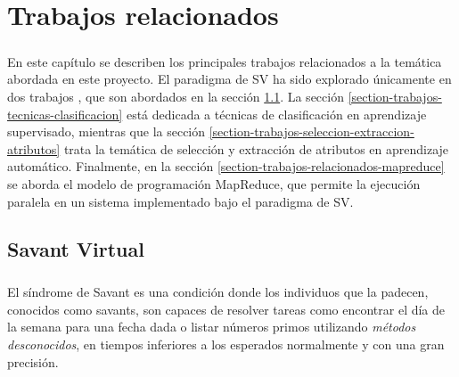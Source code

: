 \chapter{Trabajos relacionados} \label{section-trabajo-relacionado}

\paragraph{}En este capítulo se describen los principales trabajos relacionados a la temática abordada en este proyecto. El paradigma de SV ha sido explorado únicamente en dos trabajos \cite{savant-original} \cite{savant-bag}, que son abordados en la sección \ref{section-trabajos-relacionados-savant}. La sección \ref{section-trabajos-tecnicas-clasificacion} está dedicada a técnicas de clasificación en aprendizaje supervisado, mientras que la sección \ref{section-trabajos-seleccion-extraccion-atributos} trata la temática de selección y extracción de atributos en aprendizaje automático. Finalmente, en la sección \ref{section-trabajos-relacionados-mapreduce} se aborda el modelo de programación MapReduce, que permite la ejecución paralela en un sistema implementado bajo el paradigma de SV.


\section{Savant Virtual} \label{section-trabajos-relacionados-savant}

\paragraph{} El síndrome de Savant es una condición donde los individuos que la padecen, conocidos como savants, son capaces de resolver tareas como encontrar el día de la semana para una fecha dada o listar números primos utilizando \textit{métodos desconocidos}, en tiempos inferiores a los esperados normalmente y con una gran precisión. 


